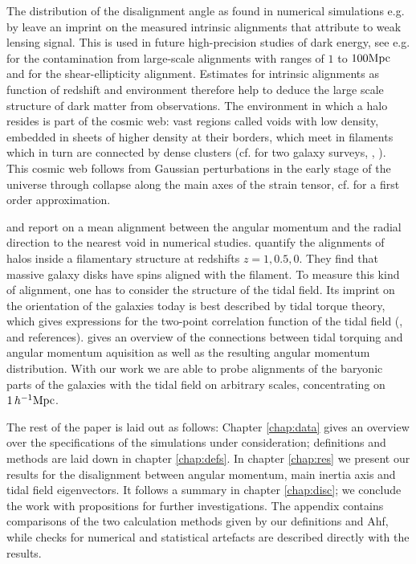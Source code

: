 \documentclass[useAMS,usenatbib]{mn2e}
\begin{document}
The distribution of the disalignment angle as found in numerical simulations
e.g. by \cite{VanDenBosch2002} leave an imprint on the measured intrinsic
alignments that attribute to weak lensing signal. This is used in future
high-precision studies of dark energy, see e.g. \cite{Catelan2001} for the
contamination from large-scale alignments with ranges of $1$ to $100\rm{Mpc}$
and \cite{Hirata2004} for the shear-ellipticity alignment. Estimates for
intrinsic alignments as function of redshift and environment therefore help to
deduce the large scale structure of dark matter from observations.
%
The environment in which a halo resides is part of the cosmic web: vast
regions called voids with low density, embedded in sheets of higher density at
their borders, which meet in filaments which in turn are connected by dense
clusters (cf. \cite{Tegmark2004} for two galaxy surveys, \cite{Shandarin1989},
\cite{Bond1996}). This cosmic web follows from Gaussian perturbations in the
early stage of the universe through collapse along the main axes of the strain
tensor, cf. \cite{Zel'Dovich1970} for a first order approximation.

\cite{Brunino2007} and \cite{Cuesta2008} report on a mean alignment between
the angular momentum and the radial direction to the nearest void in numerical
studies. \cite{Hahn2010} quantify the alignments of halos inside a filamentary
structure at redshifts $z=1,0.5,0$. They find that massive galaxy disks have
spins aligned with the filament.
%
%
To measure this kind of alignment, one has to consider the structure of the
tidal field. Its imprint on the orientation of the galaxies today is best
described by tidal torque theory, which gives expressions for the two-point
correlation function of the tidal field (\cite{Porciani2002a},
\cite{Porciani2002b} and references). \cite{Schaefer2008} gives an overview of
the connections between tidal torquing and angular momentum aquisition as well
as the resulting angular momentum distribution. With our work we are able to
probe alignments of the baryonic parts of the galaxies with the tidal field on
arbitrary scales, concentrating on $1\,h^{-1}{\rm Mpc}$.

%
The rest of the paper is laid out as follows: Chapter \ref{chap:data} gives an
overview over the specifications of the simulations under consideration;
definitions and methods are laid down in chapter \ref{chap:defs}. In chapter
\ref{chap:res} we present our results for the disalignment between angular
momentum, main inertia axis and tidal field eigenvectors. It follows a summary
in chapter \ref{chap:disc}; we conclude the work with propositions for further
investigations. The appendix contains comparisons of the two calculation
methods given by our definitions and {\sc Ahf}, while checks for numerical and
statistical artefacts are described directly with the results.
%
%
\end{document}
